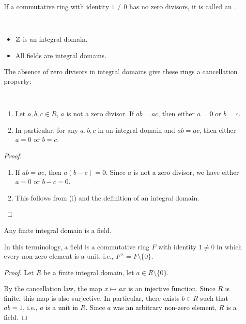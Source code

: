 \begin{definition}
If a commutative ring with identity $1\neq0$ has no zero divisors, it is called an .
\end{definition}

\begin{example} \
\begin{itemize}
\item $\mathbb Z$ is an integral domain.
\item All fields are integral domains.
\end{itemize}
\end{example}

The absence of zero divisors in integral domains give these rings a cancellation property:

\begin{lemma} \
\begin{enumerate}[label=(\roman*)]
\item Let $a,b,c\in R$, $a$ is not a zero divisor. If $ab=ac$, then either $a=0$ or $b=c$.
\item In particular, for any $a,b,c$ in an integral domain and $ab=ac$, then either $a=0$ or $b=c$.
\end{enumerate}
\end{lemma}

\begin{proof} \
\begin{enumerate}[label=(\roman*)]
\item If $ab=ac$, then $a(b-c)=0$. Since $a$ is not a zero divisor, we have either $a=0$ or $b-c=0$.
\item This follows from (i) and the definition of an integral domain.
\end{enumerate}
\end{proof}

\begin{corollary}
Any finite integral domain is a field.
\end{corollary}

In this terminology, a field is a commutative ring $F$ with identity $1\neq0$ in which every non-zero element is a unit, i.e., $F^\times=F\setminus\{0\}$.

\begin{proof}
Let $R$ be a finite integral domain, let $a\in R\setminus\{0\}$.

By the cancellation law, the map $x\mapsto ax$ is an injective function. Since $R$ is finite, this map is also surjective. In particular, there exists $b\in R$ such that $ab=1$, i.e., $a$ is a unit in $R$. Since $a$ was an arbitrary non-zero element, $R$ is a field.
\end{proof}

